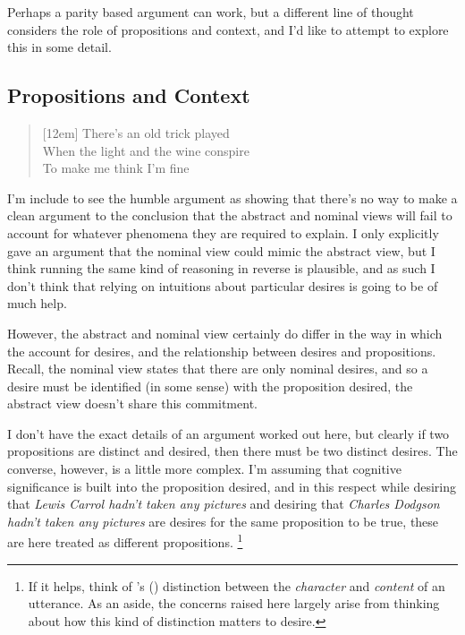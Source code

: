 \documentclass[10pt]{article}
\begin{document}
Perhaps a parity based argument can work, but a different line of thought considers the role of propositions and context, and I'd like to attempt to explore this in some detail.


\subsection{Propositions and Context}
\label{sec:prop-and-cntxt}

\begin{verse}[12em]
  There's an old trick played \\
  When the light and the wine conspire \\
  To make me think I'm fine \\
\end{verse}

I'm include to see the humble argument as showing that there's no way to make a clean argument to the conclusion that the abstract and nominal views will fail to account for whatever phenomena they are required to explain.
I only explicitly gave an argument that the nominal view could mimic the abstract view, but I think running the same kind of reasoning in reverse is plausible, and as such I don't think that relying on intuitions about particular desires is going to be of much help.

However, the abstract and nominal view certainly do differ in the way in which the account for desires, and the relationship between desires and propositions.
Recall, the nominal view states that there are only nominal desires, and so a desire must be identified (in some sense) with the proposition desired, the abstract view doesn't share this commitment.

I don't have the exact details of an argument worked out here, but clearly if two propositions are distinct and desired, then there must be two distinct desires.
The converse, however, is a little more complex.
I'm assuming that cognitive significance is built into the proposition desired, and in this respect while desiring that \emph{Lewis Carrol hadn't taken any pictures} and desiring that \emph{Charles Dodgson hadn't taken any pictures} are desires for the same proposition to be true, these are here treated as different propositions.\nolinebreak
\footnote{If it helps, think of \citeauthor{Kaplan:1989ab}'s (\citeyear{Kaplan:1989ab}) distinction between the \emph{character} and \emph{content} of an utterance.
As an aside, the concerns raised here largely arise from thinking about how this kind of distinction matters to desire.}
\end{document}
